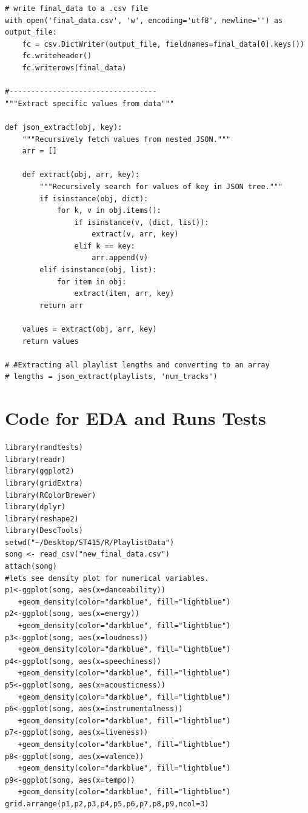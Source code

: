 \documentclass[12pt]{article}
\theoremstyle{plain}
\theoremstyle{definition}
\theoremstyle{remark}
\begin{document}
\begin{appendices}
\begin{verbatim}
# write final_data to a .csv file
with open('final_data.csv', 'w', encoding='utf8', newline='') as output_file:
    fc = csv.DictWriter(output_file, fieldnames=final_data[0].keys())
    fc.writeheader()
    fc.writerows(final_data)

#----------------------------------
"""Extract specific values from data"""

def json_extract(obj, key):
    """Recursively fetch values from nested JSON."""
    arr = []

    def extract(obj, arr, key):
        """Recursively search for values of key in JSON tree."""
        if isinstance(obj, dict):
            for k, v in obj.items():
                if isinstance(v, (dict, list)):
                    extract(v, arr, key)
                elif k == key:
                    arr.append(v)
        elif isinstance(obj, list):
            for item in obj:
                extract(item, arr, key)
        return arr

    values = extract(obj, arr, key)
    return values

# #Extracting all playlist lengths and converting to an array
# lengths = json_extract(playlists, 'num_tracks')
\end{verbatim}
\section{Code for EDA and Runs Tests}
\begin{verbatim}
library(randtests)
library(readr)
library(ggplot2)
library(gridExtra)
library(RColorBrewer)
library(dplyr)
library(reshape2)
library(DescTools)
setwd("~/Desktop/ST415/R/PlaylistData")
song <- read_csv("new_final_data.csv")
attach(song)
#lets see density plot for numerical variables.
p1<-ggplot(song, aes(x=danceability))
   +geom_density(color="darkblue", fill="lightblue")
p2<-ggplot(song, aes(x=energy))
   +geom_density(color="darkblue", fill="lightblue")
p3<-ggplot(song, aes(x=loudness))
   +geom_density(color="darkblue", fill="lightblue")
p4<-ggplot(song, aes(x=speechiness))
   +geom_density(color="darkblue", fill="lightblue")
p5<-ggplot(song, aes(x=acousticness))
   +geom_density(color="darkblue", fill="lightblue")
p6<-ggplot(song, aes(x=instrumentalness))
   +geom_density(color="darkblue", fill="lightblue")
p7<-ggplot(song, aes(x=liveness))
   +geom_density(color="darkblue", fill="lightblue")
p8<-ggplot(song, aes(x=valence))
   +geom_density(color="darkblue", fill="lightblue")
p9<-ggplot(song, aes(x=tempo))
   +geom_density(color="darkblue", fill="lightblue")
grid.arrange(p1,p2,p3,p4,p5,p6,p7,p8,p9,ncol=3)


\end{verbatim}
\end{appendices}
\end{document}
